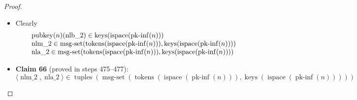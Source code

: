 \documentclass[11pt]{article}
\theoremstyle{plain}
\begin{document}
\begin{proof}
\begin{itemize}[leftmargin=2.8em, itemsep=4pt, parsep=1pt]
\begin{itemize}[leftmargin=2.8em, itemsep=4pt, parsep=1pt]
  \item[\textbf{471--473}] Clearly
\begin{equation*}
\begin{array}{@{}l@{}}
\operatorname{pubkey}(n)(\operatorname{nlb\_2}) \in \operatorname{keys}(\operatorname{ispace}(\operatorname{pk\text{-}inf}(n))) \\
\operatorname{nlm\_2} \in \operatorname{msg\text{-}set}(\operatorname{tokens}(\operatorname{ispace}(\operatorname{pk\text{-}inf}(n))), \operatorname{keys}(\operatorname{ispace}(\operatorname{pk\text{-}inf}(n)))) \\
\operatorname{nla\_2} \in \operatorname{msg\text{-}set}(\operatorname{tokens}(\operatorname{ispace}(\operatorname{pk\text{-}inf}(n))), \operatorname{keys}(\operatorname{ispace}(\operatorname{pk\text{-}inf}(n))))
\end{array}
\end{equation*}

  \item[\textbf{474}] \textbf{Claim 66} (proved in steps 475--477):
\begin{equation*}
\langle \operatorname{nlm\_2}, \operatorname{nla\_2} \rangle \in \operatorname{tuples}(\operatorname{msg\text{-}set}(\operatorname{tokens}(\operatorname{ispace}(\operatorname{pk\text{-}inf}(n))), \operatorname{keys}(\operatorname{ispace}(\operatorname{pk\text{-}inf}(n)))))
\end{equation*}


\end{itemize}
\end{itemize}
\end{proof}
\end{document}
